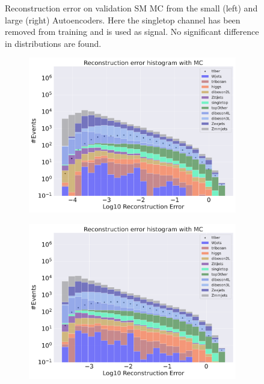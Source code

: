 \begin{figure}[H]
\begin{subfigure}{.45\textwidth}
        \caption{ }
        \label{fig:ae_big_singletop}
    \end{subfigure}
    \hfill
    \caption[AE | Reconstruction error using Singletop channel as signal]{Reconstruction error on validation SM MC from the small (left) and large (right) Autoencoders. Here the singletop channel has been removed from training and 
    is used as signal. No significant difference in distributions are found.  } 
    \label{fig:ae_big_channel_2}
\end{figure}

\begin{figure}[H]
    \centering
    \begin{subfigure}{.45\textwidth}
        \includegraphics[width=\textwidth]{Figures/AE_testing/small/b_data_recon_big_rm3_feats_sig_ttbar.pdf}
        \caption{}
        \label{fig:ae_small_ttbar}
    \end{subfigure}
    \hfill 
    \begin{subfigure}{.45\textwidth}
        \includegraphics[width=\textwidth]{Figures/AE_testing/big/b_data_recon_big_rm3_feats_sig_ttbar.pdf}

\end{subfigure}
\end{figure}
